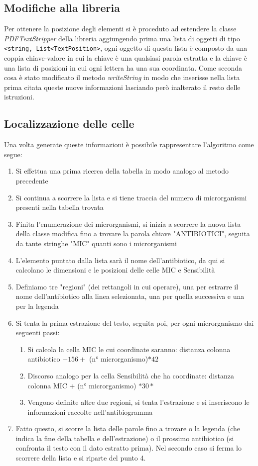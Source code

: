\subsection{Modifiche alla libreria}
Per ottenere la posizione degli elementi si è proceduto ad estendere la classe \textit{PDFTextStripper} della libreria aggiungendo prima una lista di oggetti di tipo \texttt{<string, List<TextPosition>}, ogni oggetto di questa lista è composto da una coppia chiave-valore in cui la chiave è una qualsiasi parola estratta e la chiave è una lista di posizioni in cui ogni lettera ha una sua coordinata.
Come seconda cosa è stato modificato il metodo \textit{writeString} in modo che inserisse nella lista prima citata queste nuove informazioni lasciando però inalterato il resto delle istruzioni.
\newline
\subsection{Localizzazione delle celle}\label{Algoritmo finale}
Una volta generate queste informazioni è possibile rappresentare l'algoritmo come segue:
\begin{enumerate}
	\item Si effettua una prima ricerca della tabella in modo analogo al metodo precedente
	\item Si continua a scorrere la lista e si tiene traccia del numero di microrganismi presenti nella tabella trovata
	\item Finita l'enumerazione dei microrganismi, si inizia a scorrere la nuova lista della classe modifica fino a trovare la parola chiave "ANTIBIOTICI", seguita da tante stringhe "MIC" quanti sono i microrganismi
	\item L'elemento puntato dalla lista sarà il nome dell'antibiotico, da qui si calcolano le dimensioni e le posizioni delle celle MIC e Sensibilità
	\item Definiamo tre "regioni" (dei rettangoli in cui operare), una per estrarre il nome dell'antibiotico alla linea selezionata, una per quella successiva e una per la legenda
	\item Si tenta la prima estrazione del testo, seguita poi, per ogni microrganismo dai seguenti passi:
	\begin{enumerate}
		\item Si calcola la cella MIC le cui coordinate saranno: distanza colonna antibiotico $ + 156 + $ (n° microrganismo)$*42$
		\item Discorso analogo per la cella Sensibilità che ha coordinate: distanza colonna MIC $ + $ (n° microrganismo) $*30*$
		\item Vengono definite altre due regioni, si tenta l'estrazione e si inseriscono le informazioni raccolte nell'antibiogramma
		\end{enumerate}
		\item Fatto questo, si scorre la lista delle parole fino a trovare o la legenda (che indica la fine della tabella e dell'estrazione) o il prossimo antibiotico (si confronta il testo con il dato estratto prima). Nel secondo caso si ferma lo scorrere della lista e si riparte del punto 4.
\end{enumerate}
		
